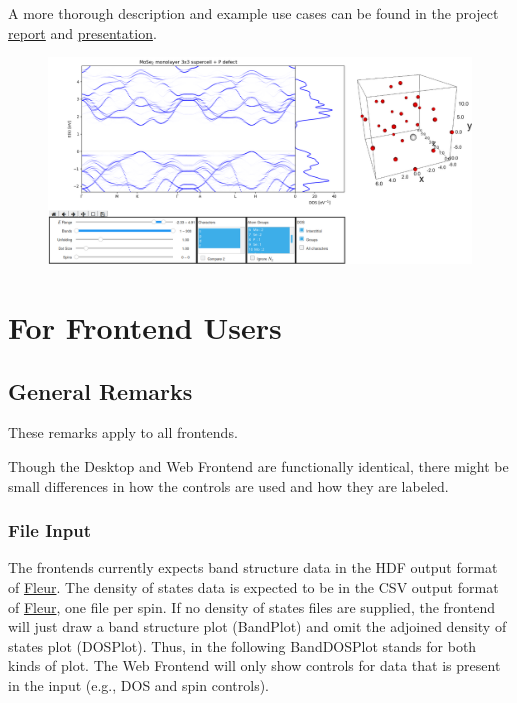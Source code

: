 A more thorough description and example use cases can be found in the
project \href{./doc/report.pdf}{report} and
\href{./doc/presentation.pdf}{presentation}.

\begin{figure}
\centering
\includegraphics{./readme/web_frontend.png}
\caption{}
\end{figure}

\section{For Frontend Users}\label{for-frontend-users}

\subsection{General Remarks}\label{general-remarks}

These remarks apply to all frontends.

Though the Desktop and Web Frontend are functionally identical, there
might be small differences in how the controls are used and how they are
labeled.

\subsubsection{File Input}\label{file-input}

The frontends currently expects band structure data in the HDF output
format of \href{http://www.judft.de}{Fleur}. The density of states data
is expected to be in the CSV output format of
\href{http://www.judft.de}{Fleur}, one file per spin. If no density of
states files are supplied, the frontend will just draw a band structure
plot (BandPlot) and omit the adjoined density of states plot (DOSPlot).
Thus, in the following BandDOSPlot stands for both kinds of plot. The
Web Frontend will only show controls for data that is present in the
input (e.g., DOS and spin controls).

